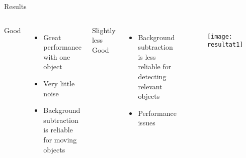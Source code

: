 
\begin{frame}{Results}


	 \begin{columns}[c] %
Good
	\begin{itemize}
	\item Great performance with one object
	\item Very little noise
	\item Background subtraction is reliable for moving objects
	\end{itemize}
	
	\vspace{4mm}
Slightly less Good
	\begin{itemize}
	\item Background subtraction is less reliable for detecting relevant objects
	\item Performance issues
	\end{itemize}
    \begin{figure}[H]
	\begin{center}
	\texttt{[image: resultat1]}
	\end{center}
	\end{figure}
    \end{columns}
\end{frame}
